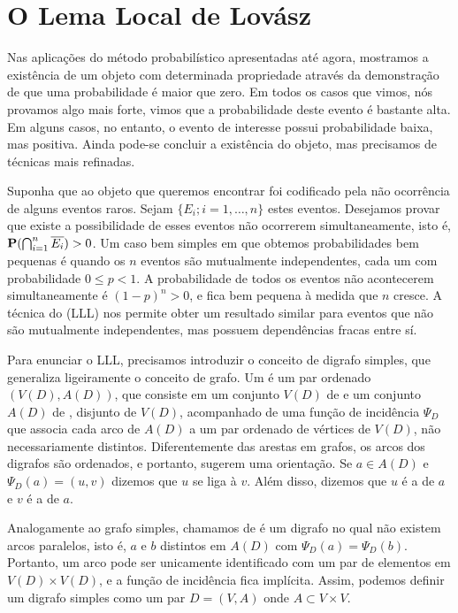 
\section{O Lema Local de Lovász}


Nas aplicações do método probabilístico apresentadas até agora, mostramos a existência de um objeto com determinada propriedade através da demonstração de que uma probabilidade é maior que zero. Em todos os casos que vimos, nós provamos algo mais forte, vimos que a probabilidade deste evento é bastante alta. Em alguns casos, no entanto, o evento de interesse possui probabilidade baixa, mas positiva. Ainda pode-se concluir a existência do objeto, mas precisamos de técnicas mais refinadas.

Suponha que ao objeto que queremos encontrar foi codificado pela não ocorrência de alguns eventos raros. Sejam $\{E_i; i = 1,\dots,n\}$ estes eventos. Desejamos provar que existe a possibilidade de esses eventos não ocorrerem simultaneamente, isto é,  $\operatorname{\mathbf{P}}(\bigcap_{i=1}^n \overline{E_i}) > 0$. Um caso bem simples em que obtemos probabilidades bem pequenas é quando os $n$ eventos são mutualmente independentes, cada um com probabilidade $0 \leq p<1$. A probabilidade de todos os eventos não acontecerem simultaneamente é $(1-p)^n > 0$, e fica bem pequena à medida que $n$ cresce. A técnica do  (LLL) nos permite obter um resultado similar para eventos que não são mutualmente independentes, mas possuem dependências fracas entre sí.

Para enunciar o LLL, precisamos introduzir o conceito de digrafo simples, que generaliza ligeiramente o conceito de grafo. Um  é um par ordenado $(V(D), A(D))$, que consiste em um conjunto $V(D)$ de  e um conjunto $A(D)$ de , disjunto de $V(D)$, acompanhado de uma função de incidência $\Psi_D$ que associa cada arco de $A(D)$ a um par ordenado de vértices de $V(D)$, não necessariamente distintos. Diferentemente das arestas em grafos, os arcos dos digrafos são ordenados, e portanto, sugerem uma orientação. Se $a \in A(D)$ e $\Psi_D(a) = (u,v)$ dizemos que $u$ se liga à $v$. Além disso, dizemos que $u$ é a  de $a$ e $v$ é a  de $a$.

Analogamente ao grafo simples, chamamos de  é um digrafo no qual não existem arcos paralelos, isto é, $a$ e $b$ distintos em $A(D)$ com $\Psi_D(a) = \Psi_D(b)$. Portanto, um arco pode ser unicamente identificado com um par de elementos em $V(D) \times V(D)$, e a função de incidência fica implícita. Assim, podemos definir um digrafo simples como um par $D = (V,A)$ onde $A \subset V\times V$.

